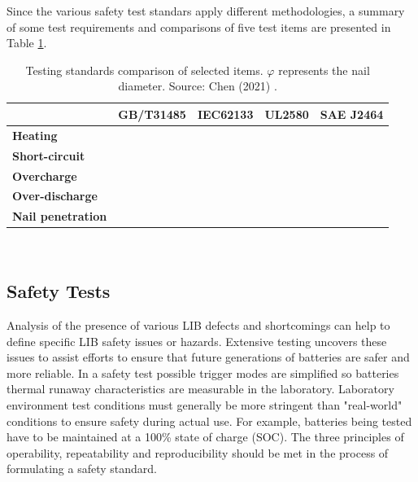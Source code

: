 Since the various safety test standars apply different methodologies, a summary of some test requirements and comparisons of five test items are presented in Table \ref{table:standards}.

\begin{table}[ht]
    \centering
        \begin{scriptsize}
            \begin{tabular}{|p{26mm} p{26mm} p{26mm} p{26mm} p{26mm}|}
                \hline
                \rowcolor{bluepoli!40}
                 & \textbf{GB/T31485} & \textbf{IEC62133} & \textbf{UL2580} & \textbf{SAE J2464}\T\B \\
                \hline \hline
                \textbf{Heating} &  &  &  & \T\B\\
                \textbf{Short-circuit} &  &  &  & \T\B\\
                \textbf{Overcharge} &  &  &  & \T\B\\
                \textbf{Over-discharge} &  &  &  & \T\B\\
                \textbf{Nail penetration} &  &  &  & \T\B\\
                \hline
                \end{tabular}
                \\[10pt]
                \caption[Testing standards coparison]{Testing standards comparison of selected items. $\varphi$ represents the nail diameter. Source: Chen (2021) \cite{chen2021review}.}
                \label{table:standards}
        \end{scriptsize}
\end{table}



\subsection{Safety Tests}
\label{sec:safety-tests}
Analysis of the presence of various LIB defects and shortcomings can help to define specific LIB safety issues or hazards. Extensive testing uncovers these issues to assist efforts to ensure that future generations of batteries are safer and more reliable. In a safety test possible trigger modes are simplified so batteries thermal runaway characteristics are measurable in the laboratory. Laboratory environment test conditions must generally be more stringent than "real-world" conditions to ensure safety during actual use. For example, batteries being tested have to be maintained at a 100\% state of charge (SOC). The three principles of operability, repeatability and reproducibility should be met in the process of formulating a safety standard. 

